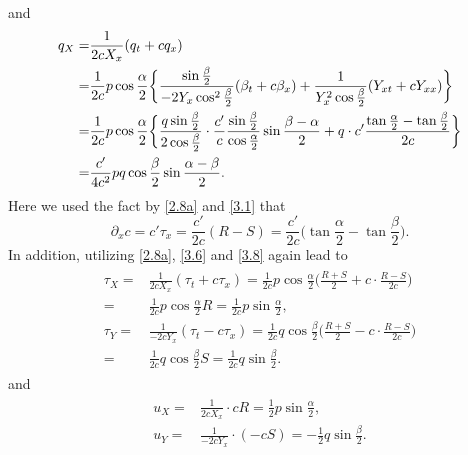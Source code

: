 \documentclass[11pt,reqno]{article}
\newcommand{\fr}{\frac}
\newcommand{\pa}{\partial}
\numberwithin{equation}{section}
\begin{document}
and
\begin{align}\label{3.11}
q_X=&\fr{1}{2cX_x}(q_t+cq_x) \notag \\ =&\fr{1}{2c}p\cos\fr{\alpha}{2}\bigg\{\fr{\sin\fr{\beta}{2}}{-2Y_x\cos^2\fr{\beta}{2}} (\beta_t+c\beta_x) +\fr{1}{Y_{x}^2\cos\fr{\beta}{2}}(Y_{xt}+cY_{xx})\bigg\}
\notag \\ =&\fr{1}{2c}p\cos\fr{\alpha}{2} \bigg\{\fr{q\sin\fr{\beta}{2}}{2\cos\fr{\beta}{2}} \cdot\fr{c'}{c}\fr{\sin\fr{\beta}{2}}{\cos\fr{\alpha}{2}}\sin\fr{\beta-\alpha}{2} +q\cdot c'\fr{\tan\fr{\alpha}{2}-\tan\fr{\beta}{2}}{2c}\bigg\} \notag \\
=&\fr{c'}{4c^2}pq\cos\fr{\beta}{2}\sin\fr{\alpha-\beta}{2}.
\end{align}
Here we used the fact by \eqref{2.8a} and \eqref{3.1} that
$$
\pa_xc=c'\tau_x=\fr{c'}{2c}(R-S)=\fr{c'}{2c}\Big(\tan\fr{\alpha}{2}-\tan\fr{\beta}{2}\Big).
$$
In addition, utilizing \eqref{2.8a}, \eqref{3.6} and \eqref{3.8} again lead to
\begin{align}\label{3.12}
\begin{split}
\tau_X=&\fr{1}{2cX_x}(\tau_t+c\tau_x)=\fr{1}{2c}p\cos\fr{\alpha}{2} \Big(\fr{R+S}{2}+c\cdot\fr{R-S}{2c}\Big)  \\
=&\fr{1}{2c}p\cos\fr{\alpha}{2}R=\fr{1}{2c}p\sin\fr{\alpha}{2}, \\
\tau_Y=&\fr{1}{-2cY_x}(\tau_t-c\tau_x)=\fr{1}{2c}q\cos\fr{\beta}{2} \Big(\fr{R+S}{2}-c\cdot\fr{R-S}{2c}\Big)   \\
=&\fr{1}{2c}q\cos\fr{\beta}{2}S=\fr{1}{2c}q\sin\fr{\beta}{2}.
\end{split}
\end{align}
and
\begin{align}\label{3.13}
\begin{split}
u_X=&\fr{1}{2cX_x}\cdot cR=\fr{1}{2}p\sin\fr{\alpha}{2},\\
u_Y=&\fr{1}{-2cY_x}\cdot (-cS)=-\fr{1}{2}q\sin\fr{\beta}{2}.
\end{split}
\end{align}
\end{document}
